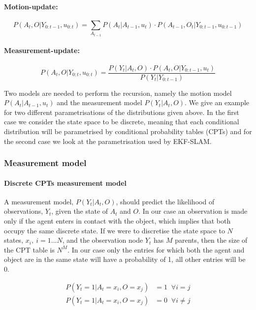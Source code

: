 \documentclass[review]{elsarticle}
\numberwithin{equation}{section}
\begin{document}
\paragraph{Motion-update:}
\begin{equation}\label{eq:time-update}
   P(A_t,O|Y_{0:t-1},u_{0:t}) = \sum_{A_{t-1}} P(A_t|A_{t-1},u_t) \cdot  P(A_{t-1},O_t|Y_{0:t-1},u_{0:t-1})
\end{equation}

\paragraph{Measurement-update:}
\begin{equation}\label{eq:measurement-update}
   P(A_t,O|Y_{0:t},u_{0:t}) = \frac{P(Y_t|A_t,O)\cdot P(A_t,O|Y_{0:t-1},u_{t}) }{P(Y_t|Y_{0:t-1})   }
\end{equation}

Two models are needed to perform the recursion, namely the motion model $P(A_t|A_{t-1},u_t)$ and the measurement model
$P(Y_t|A_t,O)$. We give an example for two different parametrisations of the distributions given above. In the first
case we consider the state space to be discrete, meaning that each conditional distribution will be parametrised by 
conditional probability tables (CPTs) and for the second case we look at the parametrisation used by EKF-SLAM. 


\subsubsection{Measurement model}\label{subsub:measurement-model}

\paragraph{Discrete CPTs measurement model}

A measurement model, $P(Y_t|A_t,O)$, should predict the likelihood of observations, $Y_t$, given the state of $A_t$ and $O$. 
In our case an observation is made only if the agent enters in contact with the object, which implies that both
occupy the same discrete state. If we were to discretise the state space to $N$ states, $x_i,\:i=1...N$, and the observation node $Y_t$  
has $M$ parents, then the size of the CPT table is $N^{M}$. In our case only the
entries for which both the agent and object are in the same state will have a probability of 1, all other entries will be 0.

\begin{align*}\label{eq:disc-measurement_function}
 P(Y_t=1|A_t=x_i,O=x_j) &= 1\;\; \forall i = j \\
 P(Y_t=1|A_t=x_i,O=x_j) &= 0\;\; \forall i \not= j \\
\end{align*}
 
\end{document}
